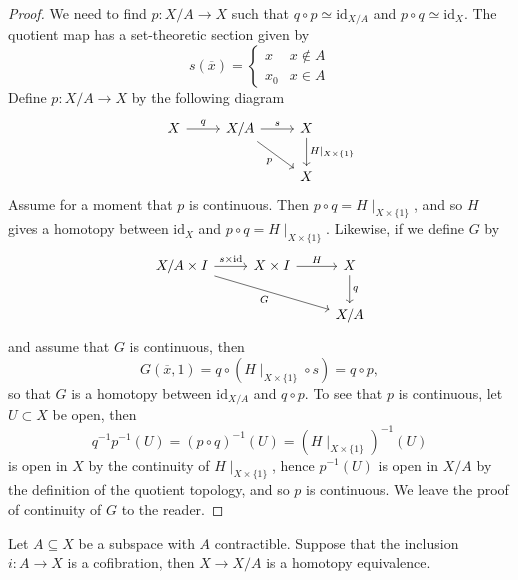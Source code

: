 \documentclass[ma3408.tex]{subfiles}
\begin{document}
\begin{proof}
We need to find $p \colon X/A \to X$ such that $q \circ p \simeq \text{id}_{X/A}$ and $p \circ q \simeq \text{id}_X$. The quotient map has a set-theoretic section given by 
\[
s(\overline x) = \begin{cases}
	x & x \not\in A\\
	x_0 & x \in A
\end{cases}
\]
Define $p \colon X/A \to X$ by the following diagram
\[\begin{tikzcd}
	X & {X/A} & X \\
	&& X
	\arrow["q", from=1-1, to=1-2]
	\arrow["s", from=1-2, to=1-3]
	\arrow["{H \mid_{X \times \{ 1 \}}}", from=1-3, to=2-3]
	\arrow["p"', from=1-2, to=2-3]
\end{tikzcd}\]
Assume for a moment that $p$ is continuous. Then $p \circ q = H\mid_{X \times \{ 1 \}}$, and so $H$ gives a homotopy between $\text{id}_X$ and $p \circ q = H \mid_{X \times \{ 1 \}}$. Likewise, if we define $G$ by 
\[\begin{tikzcd}
	{X/A \times I} & {X \times I} & X \\
	&& {X/A}
	\arrow["{s \times \text{id}}", from=1-1, to=1-2]
	\arrow["H", from=1-2, to=1-3]
	\arrow["q", from=1-3, to=2-3]
	\arrow["G"', from=1-1, to=2-3]
\end{tikzcd}\]
and assume that $G$ is continuous, then 
\[
G(\overline x,1) = q \circ (H\mid_{X \times \{ 1 \}} \circ s) = q \circ p,
\]
so that $G$ is a homotopy between $\text{id}_{X/A}$ and $q \circ p$. To see that $p$ is continuous, let $U \subset X$ be open, then 
\[
q^{-1}p^{-1}(U) = (p \circ q)^{-1}(U) = (H \mid_{X \times \{ 1\}})^{-1}(U)
\]
is open in $X$ by the continuity of $H \mid_{X \times \{ 1\}}$, hence $p^{-1}(U)$ is open in $X/A$ by the definition of the quotient topology, and so $p$ is continuous. We leave the proof of continuity of $G$ to the reader. 
\end{proof}
\begin{Thm}
Let $A \subseteq X$ be a subspace with $A$ contractible. Suppose that the inclusion $i \colon A \to X$ is a cofibration, then $X \to X/A$ is a homotopy equivalence. 
\end{Thm}
\end{document}

